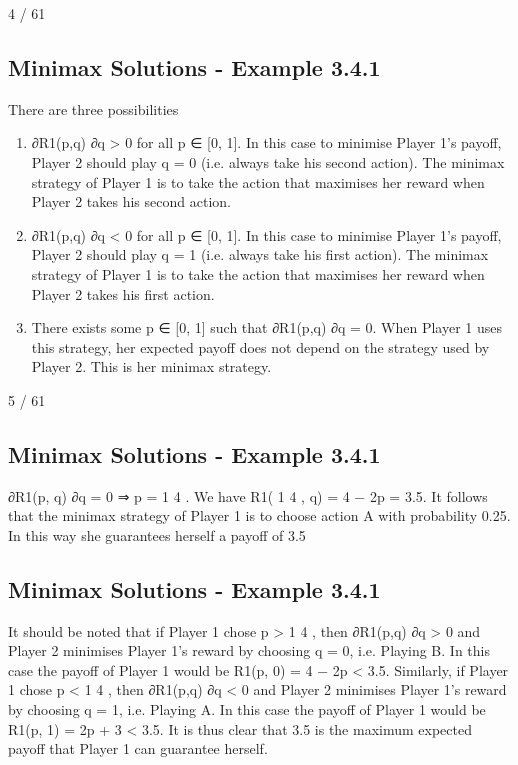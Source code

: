 \documentclass[]{report}
\begin{document}
4 / 61
\subsection{Minimax Solutions - Example 3.4.1}
There are three possibilities
\begin{enumerate}
	\item  ∂R1(p,q)
	∂q > 0 for all p ∈ [0, 1]. In this case to minimise
	Player 1’s payoff, Player 2 should play q = 0 (i.e.
	always take his second action). The minimax strategy
	of Player 1 is to take the action that maximises her
	reward when Player 2 takes his second action.
	\item  ∂R1(p,q)
	∂q < 0 for all p ∈ [0, 1]. In this case to minimise
	Player 1’s payoff, Player 2 should play q = 1 (i.e.
	always take his first action). The minimax strategy of
	Player 1 is to take the action that maximises her
	reward when Player 2 takes his first action.
	\item There exists some p ∈ [0, 1] such that ∂R1(p,q)
	∂q = 0.
	When Player 1 uses this strategy, her expected payoff
	does not depend on the strategy used by Player 2.
	This is her minimax strategy.
\end{enumerate}

5 / 61
\subsection{Minimax Solutions - Example 3.4.1}
∂R1(p, q)
∂q
= 0 ⇒ p =
1
4
.
We have
R1(
1
4
, q) = 4 − 2p = 3.5.
It follows that the minimax strategy of Player 1 is to choose action
A with probability 0.25. In this way she guarantees herself a payoff
of 3.5
\subsection{Minimax Solutions - Example 3.4.1}
It should be noted that if Player 1 chose p >
1
4
, then ∂R1(p,q)
∂q > 0
and Player 2 minimises Player 1’s reward by choosing q = 0, i.e.
Playing B.
In this case the payoff of Player 1 would be
R1(p, 0) = 4 − 2p < 3.5.
Similarly, if Player 1 chose p <
1
4
, then ∂R1(p,q)
∂q < 0 and Player 2
minimises Player 1’s reward by choosing q = 1, i.e. Playing A.
In this case the payoff of Player 1 would be
R1(p, 1) = 2p + 3 < 3.5. It is thus clear that 3.5 is the maximum
expected payoff that Player 1 can guarantee herself.
\end{document}
